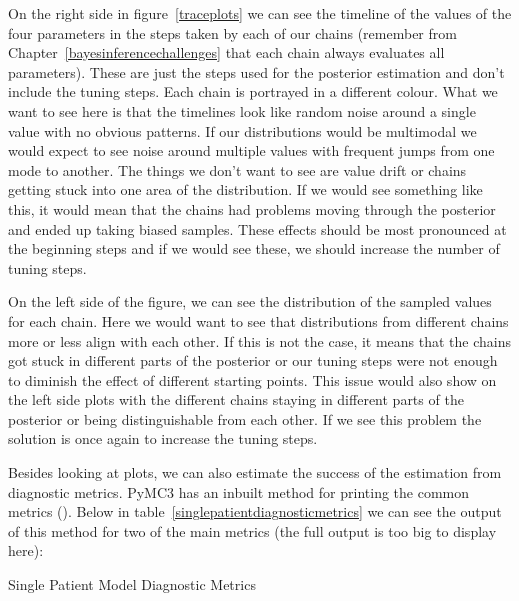 \documentclass[12pt,a4paper,leqno]{report}
\theoremstyle{plain}
\theoremstyle{definition}
\theoremstyle{remark}
\begin{document}
On the right side in figure\ \ref{traceplots} we can see the timeline of the values of the
four parameters in the steps taken by each of our
chains (remember from Chapter\ \ref{bayesinferencechallenges} that
each chain always evaluates all parameters). These are just the steps used for the
posterior estimation and don't include the
tuning steps. Each chain is portrayed in a different colour. What we want to see
here is that the timelines look like random noise around a single value with no obvious
patterns. If our distributions would be multimodal we would expect to see noise around
multiple values with frequent jumps from one mode to another. The things
we don't want to see are value drift or chains getting stuck into one area of the
distribution. If we would see something like this,
it would mean that the chains had problems moving through the posterior and ended up
taking biased samples. These effects should be most pronounced at the beginning
steps and if we would see these, we should increase the number of tuning
steps.

On the left side of the figure, we can see the distribution of the sampled values for
each chain. Here we would want to see that distributions from different chains more or
less align with
each other. If this is not the case, it means that the chains got stuck in different
parts of the posterior or our tuning steps were not enough to diminish the effect of
different starting points. This issue would also show on the left side plots with the different
chains staying in different parts of the posterior or being distinguishable from each
other. If we see this problem the solution is once again to increase the tuning steps.

Besides looking at plots, we can also estimate the success of the estimation from
diagnostic metrics. PyMC3 has an inbuilt method for printing the common metrics
(). Below in table\ \ref{singlepatientdiagnosticmetrics} we can see the output
of this method for two of the main metrics (the full output is too big to display here):

\bigskip
\begin{table}[H]
    \caption{Single Patient Model Diagnostic Metrics}\label{singlepatientdiagnosticmetrics}
    \bigskip
    \centering
    
\end{table}
\smallskip
\end{document}
